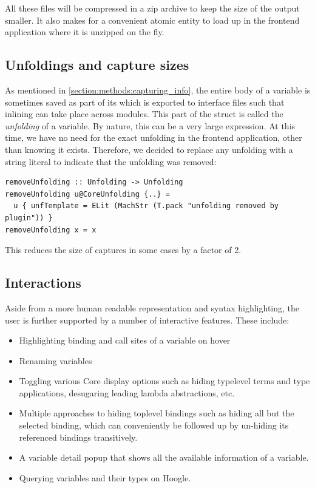 All these files will be compressed in a zip archive to keep the size of the output smaller. It also makes for
a convenient atomic entity to load up in the frontend application where it is unzipped on the fly.

\subsection{Unfoldings and capture sizes}

As mentioned in \cref{section:methods:capturing_info}, the entire body of a variable is sometimes saved as part
of its  which is exported to interface files such that inlining can take place across modules.
This part of the  struct is called the \textit{unfolding} of a variable.
By nature, this can be a very large expression. At this time, we have no
need for the exact unfolding in the frontend application, other than knowing it exists. Therefore, we decided 
to replace any unfolding with a string literal to indicate that the unfolding was removed:

\begin{listing}[H]
\begin{verbatim}
removeUnfolding :: Unfolding -> Unfolding
removeUnfolding u@CoreUnfolding {..} = 
  u { unfTemplate = ELit (MachStr (T.pack "unfolding removed by plugin")) }
removeUnfolding x = x
\end{verbatim}
\end{listing}

This reduces the size of captures in some cases by a factor of 2.

\subsection{Interactions}

Aside from a more human readable representation and syntax highlighting, the user is further supported by
a number of interactive features. These include:

\begin{itemize}
  \item Highlighting binding and call sites of a variable on hover
  \item Renaming variables
  \item Toggling various Core display options such as hiding typelevel terms and type applications, desugaring
        leading lambda abstractions, etc.
  \item Multiple approaches to hiding toplevel bindings such as hiding all but the selected binding, which
        can conveniently be followed up by un-hiding its referenced bindings transitively.
  \item A variable detail popup that shows all the available information of a variable.
  \item Querying variables and their types on Hoogle.
\end{itemize}

